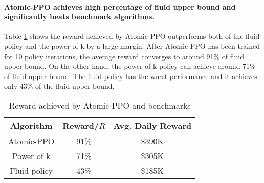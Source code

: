 \paragraph{Atomic-PPO achieves high percentage of fluid upper bound and significantly beats benchmark algorithms.} Table \ref{tab:payoff} shows the reward achieved by Atomic-PPO outperforms both of the fluid policy and the power-of-k by a large margin. After Atomic-PPO has been trained for 10 policy iterations, the average reward converges to around 91\% of fluid upper bound. On the other hand, the power-of-k policy can achieve around 71\% of fluid upper bound. The fluid policy has the worst performance and it achieves only 43\% of the fluid upper bound. %


\begin{table}[h]
    \centering
    \begin{tabular}{c|c|c}
        Algorithm & Reward/$\bar{R}$ & Avg. Daily Reward \\
        \hline
        Atomic-PPO & 91\% & \$390K\\
        Power of k & 71\% & \$305K\\
        Fluid policy & 43\% & \$185K\\
    \end{tabular}
    \caption{Reward achieved by Atomic-PPO and benchmarks}
    \label{tab:payoff}
\end{table}

